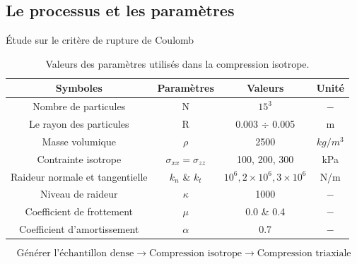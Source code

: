 \documentclass[a4paper,12pt]{report}
\begin{document}
\subsection{Le processus et les paramètres}
\begin{frame}{Étude sur le critère de rupture de Coulomb}
\begin{table}
\centering
\begin{tabular}{|c|c|c|c|}
\hline
\textbf{Symboles} & \textbf{Paramètres} & \textbf{Valeurs} & \textbf{Unité} \\ 
\hline
Nombre de particules & N & $15^3$ & $-$ \\  
\hline
Le rayon des particules & R & 0.003 $\div$ 0.005 & m \\  
\hline
Masse volumique & $\rho$  & 2500 & $kg/m^3$ \\
\hline
Contrainte isotrope & $\sigma_{xx} = \sigma_{zz}$ & 100, 200, 300 & kPa \\ 
\hline
Raideur normale et tangentielle & $k_n$ \& $k_t$ & $10^6, 2 \times 10^6, 3 \times 10^6$ & N/m \\ 
\hline
Niveau de raideur & $\kappa$ & 1000 & $-$ \\  
\hline
Coefficient de frottement & $\mu$ & 0.0 \& 0.4 & $-$ \\ 
\hline
Coefficient d'amortissement & $\alpha$  & 0.7 & $-$\\
\hline
\end{tabular}
\caption{Valeurs des paramètres utilisés dans la compression isotrope.}
\end{table}

\[
\text{Générer l'échantillon dense} \rightarrow \text{Compression isotrope} \rightarrow \text{Compression triaxiale}
\]
\end{frame}
\end{document}
